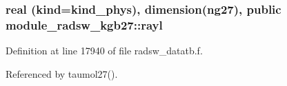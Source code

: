 \subsubsection[{\texorpdfstring{rayl}{rayl}}]{\setlength{\rightskip}{0pt plus 5cm}real (kind=kind\+\_\+phys), dimension(ng27), public module\+\_\+radsw\+\_\+kgb27\+::rayl}\hypertarget{namespacemodule__radsw__kgb27_aca4c6e06d1cd46568048a035c6726f1d}{}\label{namespacemodule__radsw__kgb27_aca4c6e06d1cd46568048a035c6726f1d}


Definition at line 17940 of file radsw\+\_\+datatb.\+f.



Referenced by taumol27().

